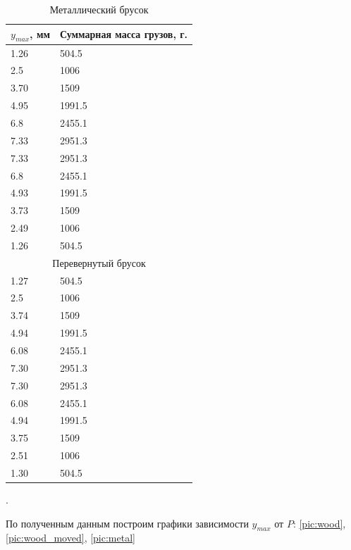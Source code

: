 \documentclass[a4paper, 12pt]{article}
\newcounter{Points}
\newcommand{\point}{\arabic{Points}. \addtocounter{Points}{1}}
\begin{document}
\begin{table}[!h]
    \centering
    \begin{tabular}{|l | l|}
        \hline 
        $y_{max}$, мм & Суммарная масса грузов, г. \\ \hline 
        1.26 & 504.5  \\ \hline
        2.5  & 1006   \\ \hline
        3.70 & 1509   \\ \hline
        4.95 & 1991.5 \\ \hline
        6.8  & 2455.1 \\ \hline
        7.33 & 2951.3 \\ \hline
        7.33 & 2951.3 \\ \hline
        6.8  & 2455.1 \\ \hline
        4.93 & 1991.5 \\ \hline
        3.73 & 1509   \\ \hline
        2.49 & 1006   \\ \hline
        1.26 & 504.5  \\ \hline

        \multicolumn{2}{|c|}{Перевернутый брусок} \\ \hline
        
        1.27 & 504.5  \\ \hline
        2.5  & 1006   \\ \hline
        3.74 & 1509   \\ \hline
        4.94 & 1991.5 \\ \hline
        6.08 & 2455.1 \\ \hline
        7.30 & 2951.3 \\ \hline
        7.30 & 2951.3 \\ \hline
        6.08 & 2455.1 \\ \hline
        4.94 & 1991.5 \\ \hline
        3.75 & 1509   \\ \hline
        2.51 & 1006   \\ \hline
        1.30 & 504.5  \\ \hline
    \end{tabular}
    \caption{Металлический брусок}
    \label{tabl:iron}
\end{table}

\point По полученным данным построим графики зависимости $y_{max}$ от $P$: \ref{pic:wood}, \ref{pic:wood_moved}, \ref{pic:metal}
\end{document}
